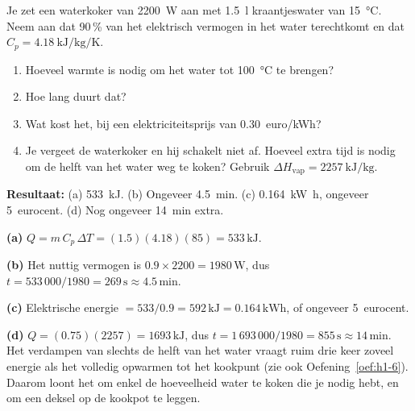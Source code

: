 \begin{oefening}
Je zet een waterkoker van \SI{2200}{\watt} aan met \SI{1.5}{\litre} kraantjeswater van \SI{15}{\celsius}. Neem aan dat 90\,\% van het elektrisch vermogen in het water terechtkomt en dat $C_p = \SI{4.18}{\kilo\joule\per\kilogram\per\kelvin}$.
\begin{enumerate}
\item[(a)] Hoeveel warmte is nodig om het water tot \SI{100}{\celsius} te brengen?
\item[(b)] Hoe lang duurt dat?
\item[(c)] Wat kost het, bij een elektriciteitsprijs van 0.30~euro/kWh?
\item[(d)] Je vergeet de waterkoker en hij schakelt niet af. Hoeveel extra tijd is nodig om de helft van het water weg te koken? Gebruik $\Delta H_{\text{vap}} = \SI{2257}{\kilo\joule\per\kilogram}$.
\end{enumerate}
\end{oefening}
\begin{oplossing}
\textbf{Resultaat:} (a) \SI{533}{\kilo\joule}. (b) Ongeveer 4.5~min. (c) \SI{0.164}{\kilo\watt\hour}, ongeveer 5~eurocent. (d) Nog ongeveer 14~min extra.

\textbf{(a)} $Q = m\,C_p\,\Delta T = (1.5)(4.18)(85) = 533\,\mathrm{kJ}$.

\textbf{(b)} Het nuttig vermogen is $0.9 \times 2200 = 1980\,\mathrm{W}$, dus $t = 533\,000/1980 = 269\,\mathrm{s} \approx 4.5\,\mathrm{min}$.

\textbf{(c)} Elektrische energie $= 533/0.9 = 592\,\mathrm{kJ} = 0.164\,\mathrm{kWh}$, of ongeveer 5~eurocent.

\textbf{(d)} $Q = (0.75)(2257) = 1693\,\mathrm{kJ}$, dus $t = 1\,693\,000/1980 = 855\,\mathrm{s} \approx 14\,\mathrm{min}$. Het verdampen van slechts de helft van het water vraagt ruim drie keer zoveel energie als het volledig opwarmen tot het kookpunt (zie ook Oefening~\ref{oef:h1-6}). Daarom loont het om enkel de hoeveelheid water te koken die je nodig hebt, en om een deksel op de kookpot te leggen.
\end{oplossing}

